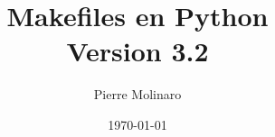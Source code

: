 \documentclass[a4paper,11pt]{extarticle}
\begin{document}
 


\title{\bf \Huge{Makefiles en Python\\Version 3.2}}
\author{Pierre Molinaro}
\date {\today}

\maketitle


\tableofcontents

\end{document}

